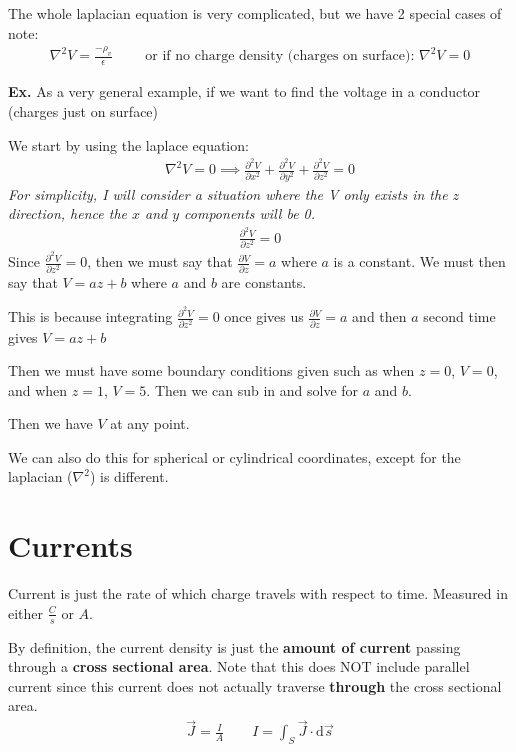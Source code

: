 \documentclass[12pt,letterpaper]{article} \usepackage{amsmath} \usepackage{graphicx} \usepackage[margin=1in]{geometry} \usepackage{longtable}  \usepackage{amssymb}
\begin{document}
	The whole laplacian equation is very complicated, but we have 2 special cases of note:
	\begin{align*}
		\nabla^2 V = \frac{-\rho_v}{\epsilon} \qquad \text{ or if no charge density (charges on surface): } \nabla^2V=0
	\end{align*}

	\begin{mdframed}
		\textbf{Ex. } As a very general example, if we want to find the voltage in a conductor (charges just on surface)
		
		We start by using the laplace equation:
		\begin{align*}
			\nabla^2 V = 0 \implies \frac{\partial^2 V}{\partial x^2} + \frac{\partial^2 V}{\partial y^2} + \frac{\partial^2 V}{\partial z^2} = 0
		\end{align*}
		\textit{For simplicity, I will consider a situation where the V only exists in the $z$ direction, hence the $x$ and $y$ components will be 0.}
		\begin{align*}
			\frac{\partial^2 V}{\partial z^2} = 0
		\end{align*}
		Since $\frac{\partial^2 V}{\partial z^2}=0$, then we must say that $\frac{\partial V}{\partial z} = a$ where $a$ is a constant. We must then say that $V = az+b$ where $a$ and $b$ are constants.
		
		This is because integrating $\frac{\partial^2 V}{\partial z^2}=0$ once gives us $\frac{\partial V}{\partial z}=a$ and then $a$ second time gives $V=az+b$
		
		Then we must have some boundary conditions given such as when $z=0$, $V=0$, and when $z=1$, $V=5$. Then we can sub in and solve for $a$ and $b$.
		
		Then we have $V$ at any point.
	\end{mdframed}

	We can also do this for spherical or cylindrical coordinates, except for the laplacian ($\nabla^2$) is different.
	
	\section{Currents}
	Current is just the rate of which charge travels with respect to time. Measured in either $\frac{C}{s}$ or $A$.
	
	By definition, the current density is just the \textbf{amount of current} passing through a \textbf{cross sectional area}. Note that this does NOT include parallel current since this current does not actually traverse \textbf{through} the cross sectional area.
	\begin{align*}
		\vec J=\frac{I}{A} \qquad I = \int_S \vec J \cdot \mathrm d \vec s
	\end{align*}
\end{document}
